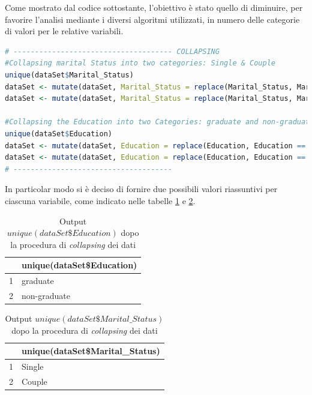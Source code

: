 \documentclass[letterpaper,11pt]{article}
\begin{document}
Come mostrato dal codice sottostante, l'obiettivo è stato quello di diminuire, per favorire l'analisi mediante i diversi algoritmi utilizzati, in numero delle categorie di valori per le relative variabili. 
\begin{lstlisting}[language=R]
# ------------------------------------- COLLAPSING
#Collapsing marital Status into two categories: Single & Couple
unique(dataSet$Marital_Status)
dataSet <- mutate(dataSet, Marital_Status = replace(Marital_Status, Marital_Status == "Divorced" | Marital_Status == "Widow" | Marital_Status == "Alone" | Marital_Status == "Absurd" | Marital_Status == "YOLO", "Single"))
dataSet <- mutate(dataSet, Marital_Status = replace(Marital_Status, Marital_Status == "Together" | Marital_Status == "Married", "Couple"))

#Collapsing the Education into two Categories: graduate and non-graduate
unique(dataSet$Education)
dataSet <- mutate(dataSet, Education = replace(Education, Education == "Graduation"| Education == "PhD" | Education == "Master", "graduate"))
dataSet <- mutate(dataSet, Education = replace(Education, Education == "Basic"| Education == "2n Cycle", "non-graduate"))
# ------------------------------------- 
\end{lstlisting}
In particolar modo si è deciso di fornire due possibili valori riassuntivi per ciascuna variabile, come indicato nelle tabelle \ref{fig:unique(dataSetEducation)2} e \ref{fig:unique(dataSetMaritalStatus)2}.

\begin{table}[H]
\centering
\begin{tabular}{rl}
  \hline
 & unique(dataSet\$Education) \\ 
  \hline
1 & graduate \\ 
  2 & non-graduate \\ 
   \hline
\end{tabular}
\caption{Output $unique(dataSet\$Education)$ dopo la procedura di \textit{collapsing} dei dati}
\label{fig:unique(dataSetEducation)2}
\end{table}


\begin{table}[H]
\centering
\begin{tabular}{rl}
  \hline
 & unique(dataSet\$Marital\_Status) \\ 
  \hline
1 & Single \\ 
  2 & Couple \\ 
   \hline
\end{tabular}
\caption{Output $unique(dataSet\$Marital\_Status)$ dopo la procedura di \textit{collapsing} dei dati}
\label{fig:unique(dataSetMaritalStatus)2}
\end{table}
\end{document}
